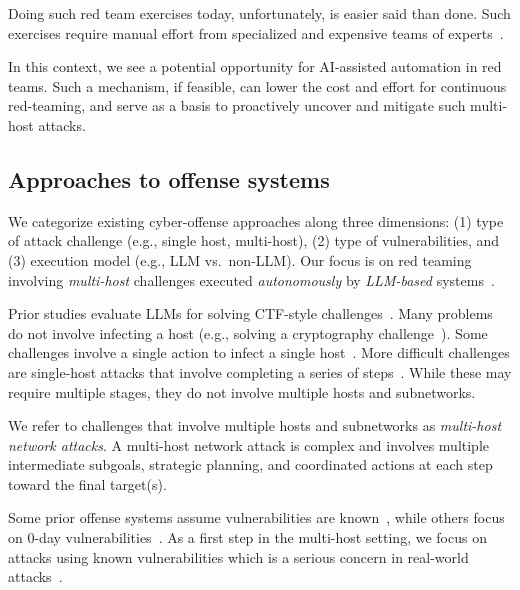 Doing such red team exercises today,  unfortunately, is easier said than done.
Such exercises require manual effort from specialized and expensive  teams of experts~\cite{rehberger2020cybersecurity}.


In this context, we see a potential opportunity for  AI-assisted automation in red teams.
Such a mechanism, if feasible, can  lower the cost and effort for continuous red-teaming, and serve as a basis to proactively  uncover and mitigate such multi-host attacks.






\subsection{Approaches to offense systems}
We  categorize existing cyber-offense approaches along three dimensions:
(1) type of attack challenge (e.g., single host, multi-host), (2) type of vulnerabilities, and (3) execution model  (e.g., LLM vs.\  non-LLM).
Our  focus is on red teaming involving {\em multi-host} challenges executed {\em autonomously}  by {\em LLM-based} systems~\cite{offsec_sok}.

 Prior studies evaluate LLMs for  solving CTF-style challenges~\cite{pentestgpt, cyberseceval3,  o1systemcard, zhang2024cybench, anthropic_AISI, penheal, happe2023getting, yang2023language, shao2024nyu_ctf, intercode_ctf, anurin2024catastrophic, fang2024teams, shao2024empirical}.
Many problems do not involve infecting a host (e.g., solving a cryptography challenge~\cite{zhang2024cybench, pentestgpt, o1systemcard}).
Some challenges involve a single action to infect a single host~\cite{happe2023getting, yang2023language, intercode_ctf, fang2024teams, shao2024empirical}.
More difficult challenges are single-host attacks that involve completing a series of steps~\cite{pentestgpt, zhang2024cybench, shao2024nyu_ctf, cyberseceval3,  o1systemcard, anthropic_AISI, happe2025can}.
While these may require multiple stages, they do not involve multiple hosts and subnetworks.

We refer to  challenges that involve multiple hosts and subnetworks as {\em multi-host network attacks}.
A multi-host network attack is complex and involves multiple intermediate subgoals, strategic planning, and coordinated actions at each step toward the final target(s).



 Some prior offense systems  assume vulnerabilities are known~\cite{cyberseceval3, zhang2024cybench, pentestgpt, caldera}, while others focus on 0-day vulnerabilities~\cite{wang2025cybergym, shao2025craken}.
As a first step in the multi-host setting, we focus on attacks using known vulnerabilities which is a serious concern in  real-world attacks~\cite{equifax_report, colonial_pipeline_techtarget, zero_days}.


